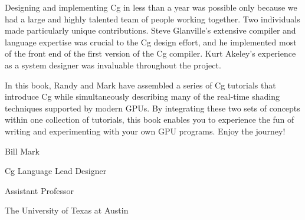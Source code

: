 \documentclass[../main.tex]{subfiles}
\begin{document}
Designing and implementing Cg in less than a year was possible only because we had a large and highly talented team of people working together. Two individuals made particularly unique contributions. Steve Glanville's extensive compiler and language expertise was crucial to the Cg design effort, and he implemented most of the front end of the first version of the Cg compiler. Kurt Akeley's experience as a system designer was invaluable throughout the project.

In this book, Randy and Mark have assembled a series of Cg tutorials that introduce Cg while simultaneously describing many of the real-time shading techniques supported by modern GPUs. By integrating these two sets of concepts within one collection of tutorials, this book enables you to experience the fun of writing and experimenting with your own GPU programs. Enjoy the journey!

Bill Mark

Cg Language Lead Designer

Assistant Professor

The University of Texas at Austin
\end{document}
